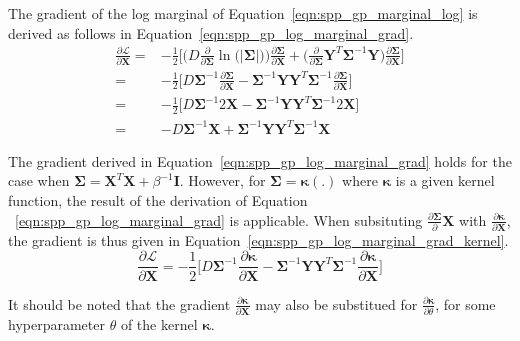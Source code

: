 The gradient of the log marginal of Equation~\ref{eqn:spp_gp_marginal_log} 
is derived as follows in Equation~\ref{eqn:spp_gp_log_marginal_grad}.
\begin{align}
  \label{eqn:spp_gp_log_marginal_grad}
  \frac{\partial \mathcal{L}}{\partial \bm{X}} ={}&
  -\frac{1}{2} \Bigg[
    \Big( D \frac{\partial}{\partial \bm{\Sigma}} 
    \ln \big( \left| \bm{\Sigma} \right| \big) \Big) 
    \frac{\partial \bm{\Sigma}}{\partial \bm{X}}
    + \Big( \frac{\partial}{\partial \bm{\Sigma}}
    \bm{Y}^{T} \bm{\Sigma}^{-1} \bm{Y} \Big)
    \frac{\partial \bm{\Sigma}}{\partial \bm{X}}
  \Bigg]\\
  =& -\frac{1}{2} \Bigg[
    D \bm{\Sigma}^{-1} \frac{\partial \bm{\Sigma}}{\partial \bm{X}}
    - \bm{\Sigma}^{-1} \bm{YY}^{T} \bm{\Sigma}^{-1} 
    \frac{\partial \bm{\Sigma}}{\partial \bm{X}}
  \Bigg]\\
  =& -\frac{1}{2} \Bigg[
    D \bm{\Sigma}^{-1} 2 \bm{X}
    - \bm{\Sigma}^{-1} \bm{YY}^{T} \bm{\Sigma}^{-1} 2 \bm{X}
  \Bigg]\\
  =& -D \bm{\Sigma}^{-1} \bm{X}
  + \bm{\Sigma}^{-1} \bm{YY}^{T} \bm{\Sigma}^{-1} \bm{X}
\end{align}

The gradient derived in Equation~\ref{eqn:spp_gp_log_marginal_grad} holds 
for the case when \( \bm{\Sigma} = \bm{X}^{T}\bm{X} + \beta^{-1} \bm{I} \). 
However, for \( \bm{\Sigma} = \bm{\kappa}(.) \) where \( \bm{\kappa} \) is 
a given kernel function, the result of the derivation of Equation
~\ref{eqn:spp_gp_log_marginal_grad} is applicable. When subsituting 
\( \frac{\partial \bm{\Sigma}}{\partial} \bm{X} \) with 
\( \frac{\partial \bm{\kappa}}{\partial \bm{X}} \), the gradient is thus 
given in Equation~\ref{eqn:spp_gp_log_marginal_grad_kernel}.
\begin{equation}
  \label{eqn:spp_gp_log_marginal_grad_kernel}
  \frac{\partial \mathcal{L}}{\partial \bm{X}} = 
  -\frac{1}{2} \Bigg[
    D \bm{\Sigma}^{-1} \frac{\partial \bm{\kappa}}{\partial \bm{X}}
    - \bm{\Sigma}^{-1} \bm{YY}^{T} \bm{\Sigma}^{-1} 
    \frac{\partial \bm{\kappa}}{\partial \bm{X}}
  \Bigg]
\end{equation}

It should be noted that the gradient \( \frac{\partial \bm{\kappa}}{\partial \bm{X}} \)
may also be substitued for \( \frac{\partial \bm{\kappa}}{\partial \theta} \), for 
some hyperparameter \( \theta \) of the kernel \( \bm{\kappa} \).

